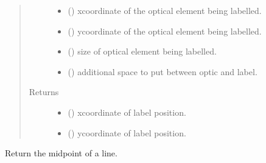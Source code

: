\documentclass[letterpaper,10pt,english]{sphinxmanual}
\begin{document}
\begin{fulllineitems}
\begin{fulllineitems}
\begin{quote}
\begin{description}
\begin{itemize}
\item {} 
\sphinxAtStartPar
{} () \textendash{} x\sphinxhyphen{}coordinate of the optical element being labelled.

\item {} 
\sphinxAtStartPar
{} () \textendash{} y\sphinxhyphen{}coordinate of the optical element being labelled.

\item {} 
\sphinxAtStartPar
{} () \textendash{} size of optical element being labelled.

\item {} 
\sphinxAtStartPar
{} () \textendash{} additional space to put between optic and label.

\end{itemize}

\item[{Returns}] \leavevmode
\sphinxAtStartPar
\begin{itemize}
\item {} 
\sphinxAtStartPar
{} () \textendash{} x\sphinxhyphen{}coordinate of label position.

\item {} 
\sphinxAtStartPar
{} () \textendash{} y\sphinxhyphen{}coordinate of label position.

\end{itemize}


\end{description}\end{quote}

\end{fulllineitems}


\begin{fulllineitems}
\label{\detokenize{index:pyopticaltable.Tools.get_midpoint}}
\sphinxAtStartPar
Return the midpoint of a line.


\end{fulllineitems}
\end{fulllineitems}
\end{document}
